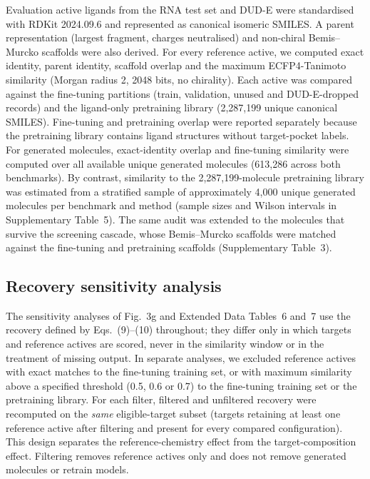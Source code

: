 \documentclass[pdflatex,sn-mathphys-num]{sn-jnl}
\theoremstyle{thmstyleone}
\theoremstyle{thmstyletwo}
\theoremstyle{thmstylethree}
\begin{document}
Evaluation active ligands from the RNA test set and DUD-E were standardised with RDKit 2024.09.6 and represented as canonical isomeric SMILES. A parent representation (largest fragment, charges neutralised) and non-chiral Bemis--Murcko scaffolds were also derived. For every reference active, we computed exact identity, parent identity, scaffold overlap and the maximum ECFP4-Tanimoto similarity (Morgan radius 2, 2048 bits, no chirality). Each active was compared against the fine-tuning partitions (train, validation, unused and DUD-E-dropped records) and the ligand-only pretraining library (2,287,199 unique canonical SMILES). Fine-tuning and pretraining overlap were reported separately because the pretraining library contains ligand structures without target-pocket labels. For generated molecules, exact-identity overlap and fine-tuning similarity were computed over all available unique generated molecules (613,286 across both benchmarks). By contrast, similarity to the 2,287,199-molecule pretraining library was estimated from a stratified sample of approximately 4,000 unique generated molecules per benchmark and method (sample sizes and Wilson intervals in Supplementary Table~5). The same audit was extended to the molecules that survive the screening cascade, whose Bemis--Murcko scaffolds were matched against the fine-tuning and pretraining scaffolds (Supplementary Table~3).

\subsection{Recovery sensitivity analysis}\label{recovery_sensitivity_methods}

The sensitivity analyses of Fig.~3g and Extended Data Tables~6 and~7 use the recovery defined by Eqs.~(9)--(10) throughout; they differ only in which targets and reference actives are scored, never in the similarity window or in the treatment of missing output. In separate analyses, we excluded reference actives with exact matches to the fine-tuning training set, or with maximum similarity above a specified threshold (0.5, 0.6 or 0.7) to the fine-tuning training set or the pretraining library. For each filter, filtered and unfiltered recovery were recomputed on the \emph{same} eligible-target subset (targets retaining at least one reference active after filtering and present for every compared configuration). This design separates the reference-chemistry effect from the target-composition effect. Filtering removes reference actives only and does not remove generated molecules or retrain models.
\end{document}
